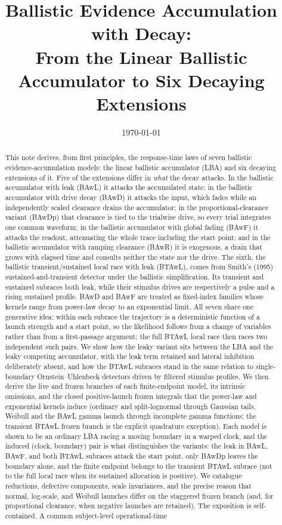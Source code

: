 \documentclass[12pt]{article}
\title{Ballistic Evidence Accumulation with Decay:\\
       From the Linear Ballistic Accumulator to Six Decaying Extensions}
\author{}
\date{\today}
\theoremstyle{remark}
\begin{document}
\maketitle

\begin{abstract}
This note derives, from first principles, the response-time laws of seven ballistic evidence-accumulation models: the linear ballistic accumulator (LBA) and six decaying extensions of it. Five of the extensions differ in \emph{what} the decay attacks. In the ballistic accumulator with leak (BAwL) it attacks the accumulated state; in the ballistic accumulator with drive decay (BAwD) it attacks the input, which fades while an independently scaled clearance drains the accumulator; in the proportional-clearance variant (BAwDp) that clearance is tied to the trialwise drive, so every trial integrates one common waveform; in the ballistic accumulator with global fading (BAwF) it attacks the readout, attenuating the whole trace including the start point; and in the ballistic accumulator with ramping clearance (BAwR) it is exogenous, a drain that grows with elapsed time and consults neither the state nor the drive. The sixth, the ballistic transient/sustained local race with leak (BTAwL), comes from Smith's (1995) sustained-and-transient detector under the ballistic simplification.  Its transient and sustained subraces both leak, while their stimulus drives are respectively a pulse and a rising sustained profile. BAwD and BAwF are treated as fixed-index families whose kernels range from power-law decay to an exponential limit. All seven share one generative idea: within each subrace the trajectory is a deterministic function of a launch strength and a start point, so the likelihood follows from a change of variables rather than from a first-passage argument; the full BTAwL local race then races two independent such pairs. We show how the leaky variant sits between the LBA and the leaky competing accumulator, with the leak term retained and lateral inhibition deliberately absent, and how the BTAwL subraces stand in the same relation to single-boundary Ornstein--Uhlenbeck detectors driven by filtered stimulus profiles. We then derive the live and frozen branches of each finite-endpoint model, its intrinsic omissions, and the closed positive-launch frozen integrals that the power-law and exponential kernels induce (ordinary and split-lognormal through Gaussian tails, Weibull and the BAwL gamma launch through incomplete gamma functions; the transient BTAwL frozen branch is the explicit quadrature exception). Each model is shown to be an ordinary LBA racing a moving boundary in a warped clock, and the induced (clock, boundary) pair is what distinguishes the variants: the leak in BAwL, BAwF, and both BTAwL subraces attack the start point, only BAwDp leaves the boundary alone, and the finite endpoint belongs to the transient BTAwL subrace (not to the full local race when its sustained allocation is positive). We catalogue reductions, defective components, scale invariances, and the precise reason that normal, log-scale, and Weibull launches differ on the staggered frozen branch (and, for proportional clearance, when negative launches are retained). The exposition is self-contained. A common subject-level operational-time 
\end{abstract}
\end{document}
